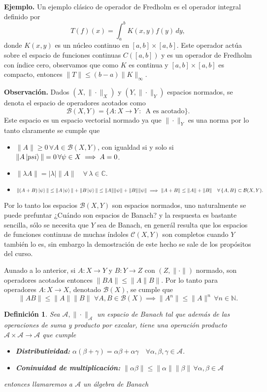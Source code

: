 \documentclass[letterpaper]{book}
\newtheorem{def.}{Definici\'on}[section]
\newcommand{\nat}{\ensuremath{ \mathbb N }}
\newcommand{\eje}{{\noindent \sc \textbf{Ejemplo. }}}
\newcommand{\obs}{{\noindent \sc \textbf{Observación. }}}
\newcommand{\co}{\ensuremath{\mathbb C }}
\begin{document}
\eje Un ejemplo clásico de operador de Fredholm es el operador integral definido por
\[
T(f)(x) = \int_a^b K(x, y) f(y) \, dy,
\]
donde \(K(x, y)\) es un núcleo continuo en \([a, b] \times [a, b]\). Este operador actúa sobre el espacio de funciones continuas \(C([a, b])\) y es un operador de Fredholm con índice cero, observamos que como \(K\) es continua y  \([a, b] \times [a, b]\) es compacto, entonces \(\|T\|\leq(b-a)\|K\|_{\infty}\).

\obs Dados \((X,\|\cdot\|_X)\) y \((Y,\|\cdot\|_Y)\) espacios normados, se denota el espacio de operadores acotados como
\[
\mathcal{B}(X,Y)=\{A:X\to Y\,:\,\text{ A es acotado}\}.
\]
\noindent Este espacio es un espacio vectorial normado ya que \(\|\cdot\|_Y\) es una norma por lo tanto claramente se cumple que
\begin{itemize}
    \item \(\|A\| \geq 0\,\forall A \in\mathcal{B}(X,Y) \), con igualdad si y solo si \(\|A\ket{psi}\| = 0\,\forall\psi\in X\implies A = 0\).
    \item \(\|\lambda A\| = |\lambda|\|A\|\quad\forall\,\lambda\in\co.\)
    \item \(\|(A + B)\ket{\psi}\| \leq \|A\ket{\psi}\| + \|B\ket{\psi}\|\leq \|A\|\|\psi\| + \|B\|\|\psi\| \implies\| A + B\| \leq \|A\| + \|B\|\quad\forall\,\{A,B\}\subset\mathcal{B}(X,Y).\)
\end{itemize}

Por lo tanto los espacios \(\mathcal{B}(X,Y)\) son espacios normados, uno naturalmente se puede prefuntar ¿Cuándo son espacios de Banach? y la respuesta es bastante sencilla, sólo se necesita que \(Y\) sea de Banach, en generál resulta que los espacios de funciones continuas de muchas índoles \(\mathcal{C}(X,Y)\) son completos cuando \(Y\) también lo es, sin embargo la demostración de este hecho se sale de los propósitos del curso.

Aunado a lo anterior, si \(A:X\to Y\) y \(B:Y\to Z\) con \((Z,\|\cdot\|)\) normado, son operadores acotados entonces \(\|BA\|\leq\|A\|B\|\). Por lo tanto para operadores \(A:X\to X\), denotado \(\mathcal{B}(X)\), se cumple que
\[
\|AB\|\leq\|A\|\|B\|\,\,\forall A,B\in\mathcal{B}(X)\implies\|A^n\|\leq\|A\|^n\,\forall n\in\nat.
\]

\begin{def.}
Sea \(\mathcal{A},\|\cdot\|_{\mathcal{A}}\) un espacio de Banach tal que además de las operaciones de suma y producto por excalar, tiene una operación producto \(\mathcal{A}\times\mathcal{A}\to\mathcal{A}\) que cumple
\begin{itemize}
    \item \textbf{Distributividad:} \(\alpha(\beta+\gamma)=\alpha\beta+\alpha\gamma\quad\forall\alpha,\beta,\gamma\in\mathcal{A}\).
    \item \textbf{Coninuidad de multiplicación:} \(\|\alpha\beta\|\leq\|\alpha\|\|\beta\|\,\forall\alpha,\beta\in\mathcal{A}\)
\end{itemize}
entonces llamaremos a \(\mathcal{A}\) un \emph{álgebra de Banach}
\end{def.}
\end{document}
